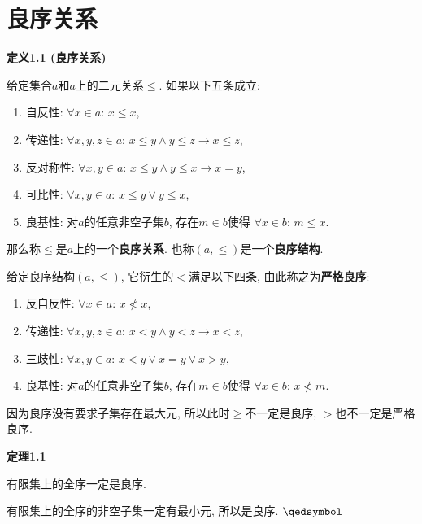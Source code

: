 \documentclass[UTF8]{ctexart}
\begin{document}
\setlength{\abovedisplayskip}{1pt}
\setlength{\belowdisplayskip}{1pt}

\section{良序关系}

\hypertarget{sec:定义1.1}{}
\noindent\textbf{定义1.1 (良序关系)}

给定集合$a$和$a$上的二元关系$\leqslant$. 如果以下五条成立:
\begin{enumerate}
    \item 自反性: $\forall x\in a:\,x\leqslant x$,
    \item 传递性: $\forall x,y,z\in a:\,
    x\leqslant y\land y\leqslant z\to x\leqslant z$,
    \item 反对称性: $\forall x,y\in a:\,x\leqslant y\land y\leqslant x\to x=y$,
    \item 可比性: $\forall x,y\in a:\,x\leqslant y\lor y\leqslant x$,
    \item 良基性: 对$a$的任意非空子集$b$, 存在$m\in b$使得
    $\forall x\in b:\,m\leqslant x$.
\end{enumerate}
那么称$\leqslant$是$a$上的一个\textbf{良序关系}.
也称$(a,\leqslant)$是一个\textbf{良序结构}.

\vspace{10pt}

给定良序结构$(a,\leqslant)$, 它衍生的$<$满足以下四条, 由此称之为\textbf{严格良序}:
\begin{enumerate}
    \item 反自反性: $\forall x\in a:\,x\nless x$,
    \item 传递性: $\forall x,y,z\in a:\,x<y\land y<z\to x<z$,
    \item 三歧性: $\forall x,y\in a:\,x<y\lor x=y\lor x>y$,
    \item 良基性: 对$a$的任意非空子集$b$, 存在$m\in b$使得
    $\forall x\in b:\,x\nless m$.
\end{enumerate}
因为良序没有要求子集存在最大元, 所以此时$\geqslant$不一定是良序, $>$也不一定是严格良序.

\vspace{10pt}

\hypertarget{sec:定理1.1}{}
\noindent\textbf{定理1.1}

有限集上的全序一定是良序.


有限集上的全序的非空子集一定有最小元, 所以是良序. \hfill $\qedsymbol$
\end{document}

